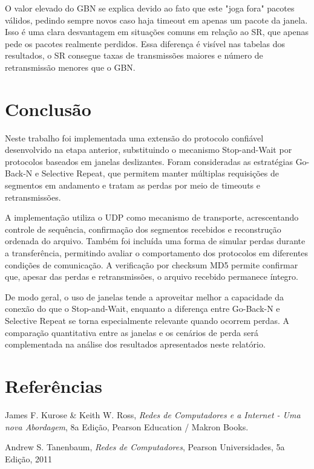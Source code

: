 \documentclass[11pt,a4paper]{article}
\begin{document}
O valor elevado do GBN se explica devido ao fato que este "joga fora" pacotes válidos, pedindo sempre novos caso haja timeout em apenas um pacote da janela.
Isso é uma clara desvantagem em situações comuns em relação ao SR, que apenas pede os pacotes realmente perdidos. Essa diferença é visível nas tabelas dos resultados,
o SR consegue taxas de transmissões maiores e número de retransmissão menores que o GBN.

\section{Conclusão}

Neste trabalho foi implementada uma extensão do protocolo confiável desenvolvido na etapa anterior, substituindo o mecanismo Stop-and-Wait por protocolos baseados em janelas deslizantes. Foram consideradas as estratégias Go-Back-N e Selective Repeat, que permitem manter múltiplas requisições de segmentos em andamento e tratam as perdas por meio de timeouts e retransmissões.

A implementação utiliza o UDP como mecanismo de transporte, acrescentando controle de sequência, confirmação dos segmentos recebidos e reconstrução ordenada do arquivo. Também foi incluída uma forma de simular perdas durante a transferência, permitindo avaliar o comportamento dos protocolos em diferentes condições de comunicação. A verificação por checksum MD5 permite confirmar que, apesar das perdas e retransmissões, o arquivo recebido permanece íntegro.

De modo geral, o uso de janelas tende a aproveitar melhor a capacidade da conexão do que o Stop-and-Wait, enquanto a diferença entre Go-Back-N e Selective Repeat se torna especialmente relevante quando ocorrem perdas. A comparação quantitativa entre as janelas e os cenários de perda será complementada na análise dos resultados apresentados neste relatório.


\section{Referências}

\begin{referencias}
\item James F. Kurose \& Keith W. Ross, \emph{Redes de Computadores e a Internet - Uma nova Abordagem}, 8a Edição, Pearson Education / Makron Books.

\item Andrew S. Tanenbaum, \emph{Redes de Computadores}, Pearson Universidades, 5a Edição, 2011
\end{referencias}
\end{document}
